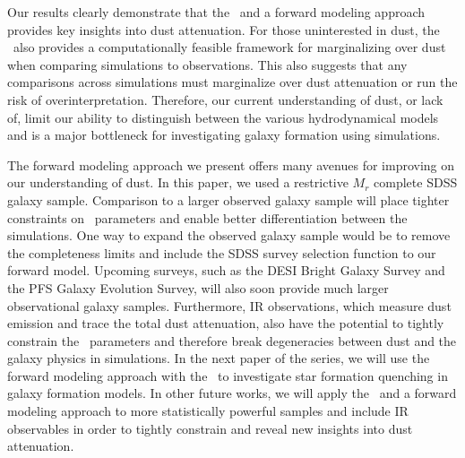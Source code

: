 Our results clearly demonstrate that the \eda~and a forward modeling approach
provides key insights into dust attenuation. For those uninterested in dust,
the \eda~also provides a computationally feasible framework for marginalizing
over dust when comparing simulations to observations. 
This also suggests that any comparisons across simulations must marginalize
over dust attenuation or run the risk of overinterpretation. 
Therefore, our current understanding of dust, or lack of, limit our ability to
distinguish between the various hydrodynamical models and is a major bottleneck
for investigating galaxy formation using simulations.

The forward modeling approach we present offers many avenues for improving on
our understanding of dust. In this paper, we used a restrictive 
$M_r$ complete SDSS galaxy sample. Comparison to a larger observed galaxy
sample will place tighter constraints on \eda~parameters and enable better
differentiation between the simulations. One way to expand the observed galaxy
sample would be to remove the completeness limits and include the SDSS survey
selection function to our forward model. Upcoming surveys, such as the DESI
Bright Galaxy Survey and the PFS Galaxy Evolution Survey, will also soon
provide much larger observational galaxy samples. Furthermore, IR observations,
which measure dust emission and trace the total dust attenuation, also have the
potential to tightly constrain the \eda~parameters and therefore break degeneracies
between dust and the galaxy physics in simulations. 
In the next paper of the series, we will use the forward modeling approach
with the \eda~to investigate star formation quenching in galaxy formation
models. 
In other future works, we will apply the \eda~and a forward modeling approach
to more statistically powerful samples and include IR observables in order to
tightly constrain and reveal new insights into dust attenuation. 
